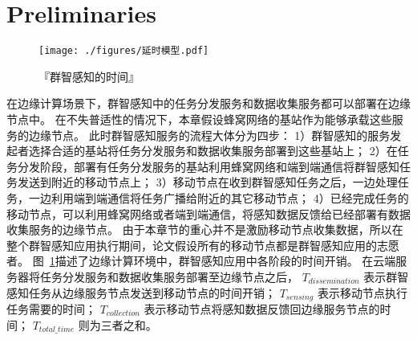 \section{Preliminaries}


\begin{figure}[!b]
  \centering
  \vspace{-1em}
  \texttt{[image: ./figures/延时模型.pdf]}
  \vspace{-0.5em}
  \caption{『群智感知的时间』}
  \label{Figure_MCS_Delay}
\end{figure}

在边缘计算场景下，群智感知中的任务分发服务和数据收集服务都可以部署在边缘节点中。
在不失普适性的情况下，本章假设蜂窝网络的基站作为能够承载这些服务的边缘节点。
此时群智感知服务的流程大体分为四步：
1）群智感知的服务发起者选择合适的基站将任务分发服务和数据收集服务部署到这些基站上；
2）在任务分发阶段，部署有任务分发服务的基站利用蜂窝网络和端到端通信将群智感知任务发送到附近的移动节点上；
3）移动节点在收到群智感知任务之后，一边处理任务，一边利用端到端通信将任务广播给附近的其它移动节点；
4）已经完成任务的移动节点，可以利用蜂窝网络或者端到端通信，将感知数据反馈给已经部署有数据收集服务的边缘节点。
由于本章节的重心并不是激励移动节点收集数据，所以在整个群智感知应用执行期间，论文假设所有的移动节点都是群智感知应用的志愿者。
图~\ref{Figure_MCS_Delay}描述了边缘计算环境中，群智感知应用中各阶段的时间开销。
在云端服务器将任务分发服务和数据收集服务部署至边缘节点之后，
$T_{dissemination}$ 表示群智感知任务从边缘服务节点发送到移动节点的时间开销；
$T_{sensing}$ 表示移动节点执行任务需要的时间；
$T_{collection}$ 表示移动节点将感知数据反馈回边缘服务节点的时间；
$T_{total\_time}$ 则为三者之和。



